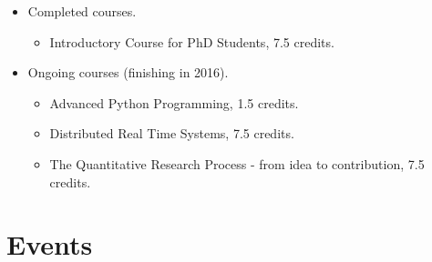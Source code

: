 \documentclass[]{report}
\begin{document}
\begin{itemize} 
	\item Completed courses.
	\begin{itemize}
		\item Introductory Course for PhD Students, 7.5 credits.
	\end{itemize}	
	\item Ongoing courses (finishing in 2016).
		\begin{itemize}
			\item Advanced Python Programming, 1.5 credits.
			\item Distributed Real Time Systems, 7.5 credits.
			\item The Quantitative Research Process - from idea to contribution, 7.5 credits.
		\end{itemize}
\end{itemize}

\section*{Events}
\end{document}
